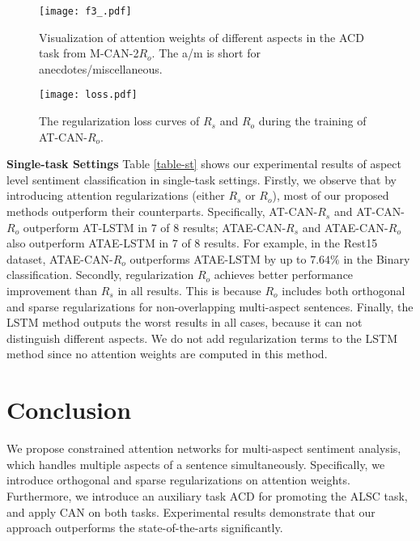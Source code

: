 \documentclass[11pt,a4paper]{article}
\begin{document}
\begin{figure}
\setlength{\abovecaptionskip}{0.1cm}   %
\setlength{\belowcaptionskip}{-0.4cm}   %
\centering
\texttt{[image: f3\_.pdf]}
\caption{Visualization of attention weights of different aspects in the ACD task from M-CAN-2$R_o$. The a/m is short for anecdotes/miscellaneous.} 
  \label{ACD-att} 
\end{figure}

\begin{figure}
\setlength{\abovecaptionskip}{0.1cm}   %
\setlength{\belowcaptionskip}{-0.5cm}   %
\centering
\texttt{[image: loss.pdf]}
\caption{The regularization loss curves of $R_s$ and $R_o$ during the training of AT-CAN-$R_o$.} 
  \label{figure:reg-loss} 
\end{figure}

{\bf Single-task Settings} Table \ref{table-st} shows our experimental results of aspect level sentiment classification in single-task settings. Firstly, we observe that by introducing attention regularizations (either $R_s$ or $R_o$), most of our proposed methods outperform their counterparts. Specifically, AT-CAN-$R_s$ and AT-CAN-$R_o$ outperform AT-LSTM in $7$ of $8$ results; ATAE-CAN-$R_s$ and ATAE-CAN-$R_o$ also outperform ATAE-LSTM in $7$ of $8$ results. For example, in the Rest15 dataset, ATAE-CAN-$R_o$ outperforms ATAE-LSTM by up to $7.64\%$ in the Binary classification. Secondly, regularization $R_o$ achieves better performance improvement than $R_s$ in all results. This is because $R_o$ includes both orthogonal and sparse regularizations for non-overlapping multi-aspect sentences. Finally, the LSTM method outputs the worst results in all cases, because it can not distinguish different aspects. We do not add regularization terms to the LSTM method since no attention weights are computed in this method. 


\section{Conclusion}
We propose constrained attention networks for multi-aspect sentiment analysis, which handles multiple aspects of a sentence simultaneously. Specifically, we introduce orthogonal and sparse regularizations on attention weights. Furthermore, we introduce an auxiliary task ACD for promoting the ALSC task, and apply CAN on both tasks. Experimental results demonstrate that our approach outperforms the state-of-the-arts significantly. 



\end{document}
